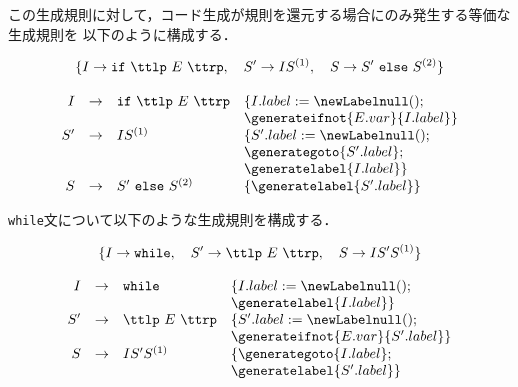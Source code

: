 \documentclass[dvipdfmx,a4j]{jbook}
\begin{document}
この生成規則に対して，コード生成が規則を還元する場合にのみ発生する等価な生成規則を
以下のように構成する．

\[\{I\rightarrow \texttt{if}\ \ttlp\ E\ \ttrp,\quad
S'\rightarrow IS^{(1)},\quad
S\rightarrow S'\ \texttt{else}\ S^{(2)}\}\]

\[\begin{array}{rcll}
  I & \rightarrow & \texttt{if}\ \ttlp\ E\ \ttrp
  & \{I.label:=\newLabelnull();\\
  & & & \generateifnot{E.var}{I.label}\}\\
  S' & \rightarrow & IS^{(1)}
  & \{S'.label:=\newLabelnull();\\
  &  & & \generategoto{S'.label};\\
  &  & & \generatelabel{I.label}\}\\
  S & \rightarrow & S'\ \texttt{else}\ S^{(2)} &
  \{\generatelabel{S'.label}\}
 \end{array}\]

\vspace*{10pt}

{\tt while}文について以下のような生成規則を構成する．

\[\{I\rightarrow{\tt while},\quad S'\rightarrow\ttlp\ E\ \ttrp,\quad
S\rightarrow IS'S^{(1)}\}\]

 \[\begin{array}{rcll}
  I & \rightarrow & \texttt{while}\ & \{I.label:=\newLabelnull();\\
    & & & \generatelabel{I.label}\}\\
  S' & \rightarrow & \ttlp\ E\ \ttrp & \{S'.label:=\newLabelnull();\\
    & & & \generateifnot{E.var}{S'.label}\}\\
  S & \rightarrow & IS'S^{(1)} & \{\generategoto{I.label};\\
    & & & \generatelabel{S'.label}\}
 \end{array}\]



\end{document}
